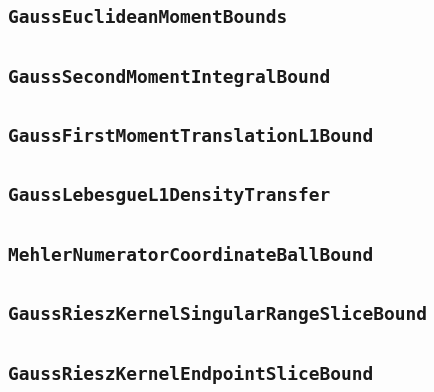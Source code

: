 \documentclass[11pt]{amsart}
\theoremstyle{definition}
\begin{document}
\subsection{\texorpdfstring{\texttt{GaussEuclideanMomentBounds}}{GaussEuclideanMomentBounds}}\label{node:GaussEuclideanMomentBounds}


\subsection{\texorpdfstring{\texttt{GaussSecondMomentIntegralBound}}{GaussSecondMomentIntegralBound}}\label{node:GaussSecondMomentIntegralBound}


\subsection{\texorpdfstring{\texttt{GaussFirstMomentTranslationL1Bound}}{GaussFirstMomentTranslationL1Bound}}\label{node:GaussFirstMomentTranslationL1Bound}


\subsection{\texorpdfstring{\texttt{GaussLebesgueL1DensityTransfer}}{GaussLebesgueL1DensityTransfer}}\label{node:GaussLebesgueL1DensityTransfer}


\subsection{\texorpdfstring{\texttt{MehlerNumeratorCoordinateBallBound}}{MehlerNumeratorCoordinateBallBound}}\label{node:MehlerNumeratorCoordinateBallBound}


\subsection{\texorpdfstring{\texttt{GaussRieszKernelSingularRangeSliceBound}}{GaussRieszKernelSingularRangeSliceBound}}\label{node:GaussRieszKernelSingularRangeSliceBound}


\subsection{\texorpdfstring{\texttt{GaussRieszKernelEndpointSliceBound}}{GaussRieszKernelEndpointSliceBound}}\label{node:GaussRieszKernelEndpointSliceBound}

\end{document}
